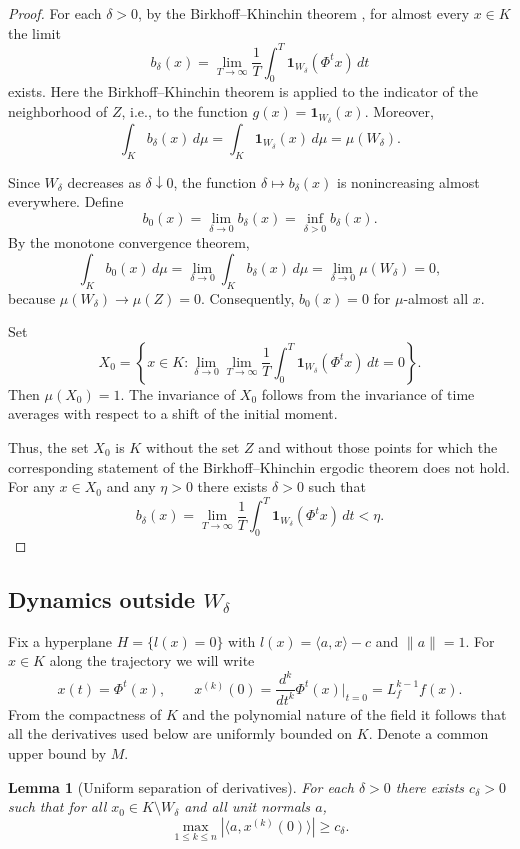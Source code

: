 \documentclass[11pt]{article}
\newcommand{\dd}{\,d}
\theoremstyle{thmstyleone}
\newtheorem{lemma}[theorem]{Lemma}
\theoremstyle{thmstyletwo}
\theoremstyle{thmstylethree}
\begin{document}
\begin{appendices}
\begin{proof}
For each $\delta>0$, by the Birkhoff–Khinchin theorem \cite{Birkhoff1931,CornfeldFominSinai1982}, for almost every $x\in K$ the limit
\[
    b_\delta(x)=\lim_{T\to\infty}\frac1T\int_0^T\mathbf 1_{W_\delta}(\Phi^t x)\dd t
\]
exists. Here the Birkhoff–Khinchin theorem is applied to the indicator of the neighborhood of $Z$, i.e., to the function $g(x)=\mathbf 1_{W_\delta}(x)$. Moreover,
\[
    \int_K b_\delta(x)\dd\mu
    =\int_K \mathbf 1_{W_\delta}(x)\dd\mu
    =\mu(W_\delta).
\]

Since $W_\delta$ decreases as $\delta\downarrow0$, the function $\delta\mapsto b_\delta(x)$ is nonincreasing almost everywhere. Define
\[
    b_0(x)=\lim_{\delta\to0}b_\delta(x)=\inf_{\delta>0}b_\delta(x).
\]
By the monotone convergence theorem,
\[
    \int_K b_0(x)\dd\mu
    =\lim_{\delta\to0}\int_K b_\delta(x)\dd\mu
    =\lim_{\delta\to0}\mu(W_\delta)=0,
\]
because $\mu(W_\delta)\to\mu(Z)=0$. Consequently, $b_0(x)=0$ for $\mu$-almost all $x$.

Set
\[
    X_0=\left\{x\in K:
    \lim_{\delta\to0}\lim_{T\to\infty}
    \frac1T\int_0^T\mathbf 1_{W_\delta}(\Phi^t x)\dd t=0
    \right\}.
\]
Then $\mu(X_0)=1$. The invariance of $X_0$ follows from the invariance of time averages with respect to a shift of the initial moment.

Thus, the set $X_0$ is $K$ without the set $Z$ and without those points for which the corresponding statement of the Birkhoff–Khinchin ergodic theorem does not hold. For any $x\in X_0$ and any $\eta>0$ there exists $\delta>0$ such that
\[
    b_\delta(x)=\lim_{T\to\infty}\frac1T\int_0^T\mathbf 1_{W_\delta}(\Phi^t x)\dd t<\eta.
\]
\end{proof}

\subsection*{Dynamics outside $W_\delta$}

Fix a hyperplane $H=\{l(x)=0\}$ with $l(x)=\langle a,x\rangle-c$ and $\|a\|=1$. For $x\in K$ along the trajectory we will write
\[
    x(t)=\Phi^t(x),
    \qquad
    x^{(k)}(0)=\frac{d^k}{dt^k}\Phi^t(x)\bigg|_{t=0}=L_f^{k-1}f(x).
\]
From the compactness of $K$ and the polynomial nature of the field it follows that all the derivatives used below are uniformly bounded on $K$. Denote a common upper bound by $M$.

\begin{lemma}[Uniform separation of derivatives]
\label{lem:sep}\label{lem:derivative_separation_2}
For each $\delta>0$ there exists $c_\delta>0$ such that for all $x_0\in K\setminus W_\delta$ and all unit normals $a$,
\[
    \max_{1\le k\le n}|\langle a,x^{(k)}(0)\rangle|\ge c_\delta.
\]
\end{lemma}


\end{appendices}
\end{document}
